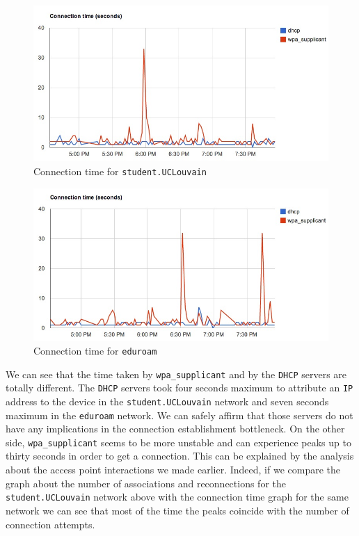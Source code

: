 \begin{figure}[H]
	\centering
   \includegraphics[width=1\textwidth]{Pictures/chapter6/time-student.jpg}
   \caption{Connection time for \texttt{student.UCLouvain}}
\end{figure} 

\begin{figure}[H]
	\centering
   \includegraphics[width=1\textwidth]{Pictures/chapter6/time-eduroam.jpg}
   \caption{Connection time for \texttt{eduroam}}
\end{figure} 

We can see that the time taken by \texttt{wpa\_supplicant} and by the \texttt{DHCP} servers are totally different. The \texttt{DHCP} servers took four seconds maximum to attribute an \texttt{IP} address to the device in the \texttt{student.UCLouvain} network and seven seconds maximum in the \texttt{eduroam} network. We can safely affirm that those servers do not have any implications in the connection establishment bottleneck. On the other side, \texttt{wpa\_supplicant} seems to be more unstable and can experience peaks up to thirty seconds in order to get a connection. This can be explained by the analysis about the access point interactions we made earlier. Indeed, if we compare the graph about the number of associations and reconnections for the \texttt{student.UCLouvain} network above with the connection time graph for the same network we can see that most of the time the peaks coincide with the number of connection attempts. 

